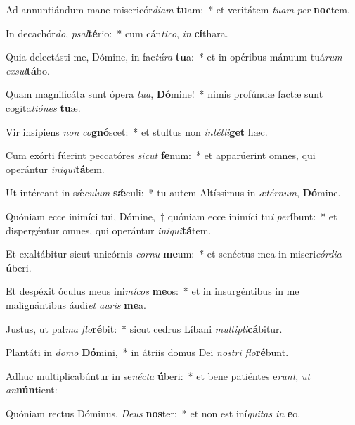 \item Ad annuntiándum mane misericór\textit{di}\textit{am} \textbf{tu}am:~* et veritátem \textit{tu}\textit{am} \textit{per} \textbf{noc}tem.
\item In decachór\textit{do}, \textit{psal}\textbf{té}rio:~* cum cán\textit{ti}\textit{co}, \textit{in} \textbf{cí}thara.
\item Quia delectásti me, Dómine, in fac\textit{tú}\textit{ra} \textbf{tu}a:~* et in opéribus mánuum tuá\textit{rum} \textit{ex}\textit{sul}\textbf{tá}bo.
\item Quam magnificáta sunt ópera \textit{tu}\textit{a}, \textbf{Dó}mine!~* nimis profúndæ factæ sunt cogita\textit{ti}\textit{ó}\textit{nes} \textbf{tu}æ.
\item Vir insípiens \textit{non} \textit{co}\textbf{gnó}scet:~* et stultus non \textit{in}\textit{tél}\textit{li}\textbf{get} hæc.
\item Cum exórti fúerint peccatóres \textit{sic}\textit{ut} \textbf{fe}num:~* et apparúerint omnes, qui operántur \textit{in}\textit{i}\textit{qui}\textbf{tá}tem.
\item Ut intéreant in sǽ\textit{cu}\textit{lum} \textbf{sǽ}culi:~* tu autem Altíssimus in \textit{æ}\textit{tér}\textit{num}, \textbf{Dó}mine.
\item Quóniam ecce inimíci tui, Dómine,~† quóniam ecce inimíci tu\textit{i} \textit{per}\textbf{í}bunt:~* et dispergéntur omnes, qui operántur \textit{in}\textit{i}\textit{qui}\textbf{tá}tem.
\item Et exaltábitur sicut unicórnis \textit{cor}\textit{nu} \textbf{me}um:~* et senéctus mea in miseri\textit{cór}\textit{di}\textit{a} \textbf{ú}beri.
\item Et despéxit óculus meus ini\textit{mí}\textit{cos} \textbf{me}os:~* et in insurgéntibus in me malignántibus áudi\textit{et} \textit{au}\textit{ris} \textbf{me}a.
\item Justus, ut pal\textit{ma} \textit{flo}\textbf{ré}bit:~* sicut cedrus Líbani \textit{mul}\textit{ti}\textit{pli}\textbf{cá}bitur.
\item Plantáti in \textit{do}\textit{mo} \textbf{Dó}mini,~* in átriis domus Dei \textit{nos}\textit{tri} \textit{flo}\textbf{ré}bunt.
\item Adhuc multiplicabúntur in se\textit{néc}\textit{ta} \textbf{ú}beri:~* et bene patiéntes e\textit{runt}, \textit{ut} \textit{an}\textbf{nún}tient:
\item Quóniam rectus Dóminus, \textit{De}\textit{us} \textbf{nos}ter:~* et non est iní\textit{qui}\textit{tas} \textit{in} \textbf{e}o.
